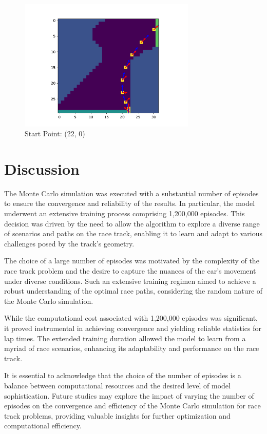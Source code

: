 \documentclass{article}
\begin{document}
\begin{figure}[H]
	\centering
	\includegraphics[width=0.75\textwidth]{../figure/fig_22}
	\caption{Start Point: (22, 0)}
	\label{fig:fig_22}
\end{figure}





\section{Discussion}
The Monte Carlo simulation was executed with a substantial number of episodes to ensure the convergence and reliability of the results. In particular, the model underwent an extensive training process comprising 1,200,000 episodes. This decision was driven by the need to allow the algorithm to explore a diverse range of scenarios and paths on the race track, enabling it to learn and adapt to various challenges posed by the track's geometry.

The choice of a large number of episodes was motivated by the complexity of the race track problem and the desire to capture the nuances of the car's movement under diverse conditions. Such an extensive training regimen aimed to achieve a robust understanding of the optimal race paths, considering the random nature of the Monte Carlo simulation.

While the computational cost associated with 1,200,000 episodes was significant, it proved instrumental in achieving convergence and yielding reliable statistics for lap times. The extended training duration allowed the model to learn from a myriad of race scenarios, enhancing its adaptability and performance on the race track.

It is essential to acknowledge that the choice of the number of episodes is a balance between computational resources and the desired level of model sophistication. Future studies may explore the impact of varying the number of episodes on the convergence and efficiency of the Monte Carlo simulation for race track problems, providing valuable insights for further optimization and computational efficiency.
\end{document}
